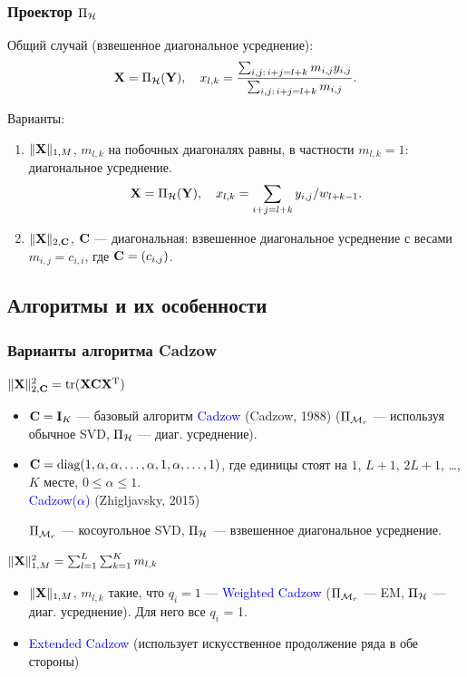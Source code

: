 \documentclass[unicode, notheorems]{beamer}
\begin{document}
\begin{frame}
	\frametitle{Проектор $\Pi_{\mathcal{H}}$}
	Общий случай (взвешенное диагональное усреднение):
	\begin{equation*}
		\mathbf{X} = \Pi_{\mathcal{H}}(\mathbf{Y}), \quad x_{l,k} = \frac{\sum_{i,j:\, i+j=l+k} m_{i, j} y_{i,j}}{\sum_{i,j:\, i+j=l+k} m_{i,j}}.
	\end{equation*}
		
	Варианты:
	\begin{enumerate}
		\item $\|\mathbf{X}\|_{1, M}$, $m_{l,k}$ на побочных диагоналях равны, в частности $m_{l, k} = 1$: диагональное усреднение.
		\begin{equation*}
		\mathbf{X} = \Pi_{\mathcal{H}}(\mathbf{Y}), \quad x_{l,k} = \sum_{i + j = l + k} y_{i, j} / w_{l + k - 1}.
		\end{equation*}
		\item $\|\mathbf{X}\|_{2, \mathbf{C}}$, $\mathbf{C}$ --- диагональная: взвешенное диагональное усреднение с весами $m_{i,j} = c_{i, i}$, где $\mathbf{C} = (c_{i, j})$.
		
	\end{enumerate}
\end{frame}

\subsection{Алгоритмы и их особенности}
\begin{frame}
	\frametitle{Варианты алгоритма Cadzow} 
	$\|\mathbf{X}\|_{2, \mathbf{C}}^2 = \text{tr}(\mathbf{X} \mathbf{C} \mathbf{X}^{\mathrm{T}})$
	\begin{itemize}
		\item $\mathbf{C} = \mathbf{I}_K$ --- базовый алгоритм \textcolor{blue}{Cadzow} (Cadzow, 1988) ($\Pi_{\mathcal{M}_r}$ --- используя обычное SVD, $\Pi_{\mathcal{H}}$ --- диаг. усреднение).
		\item $\mathbf{C} = \text{diag}(1, \alpha, \alpha, \ldots, \alpha, 1, \alpha, \ldots, 1)$,
		где единицы стоят на $1$, $L + 1$, $2L + 1$, \ldots , $K$ месте, $0 \le \alpha \le 1$. \\ \textcolor{blue}{Cadzow($\alpha$)} (Zhigljavsky, 2015)
		
		$\Pi_{\mathcal{M}_r}$ --- косоугольное SVD, $\Pi_{\mathcal{H}}$ --- взвешенное диагональное усреднение.
	\end{itemize}
	
	\vspace{0.3cm}
	$\|\mathbf{X}\|^2_{1, M} =  \sum_{l = 1}^L \sum_{k = 1}^K m_{l, k}$
	\begin{itemize}
		\item $\|\mathbf{X}\|_{1, M}$, $m_{l, k}$ такие, что $q_i = 1$ --- \textcolor{blue}{Weighted Cadzow} ($\Pi_{\mathcal{M}_r}$ --- EM, $\Pi_{\mathcal{H}}$ --- диаг. усреднение). Для него все $q_i$ = 1.
		\item \textcolor{blue}{Extended Cadzow} (использует искусственное продолжение ряда в обе стороны)
	\end{itemize}
\end{frame}
\end{document}
